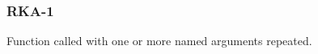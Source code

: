 \subsubsection{RKA-1}\label{sec:error_code_rka_1}

Function called with one or more named arguments repeated.


